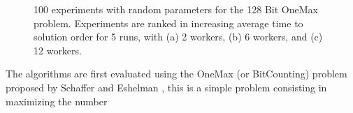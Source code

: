 \documentclass[conference]{IEEEtran}
\begin{document}
\begin{figure}[h!tb]
    \centering

    \caption{100 experiments with random parameters for the 128 Bit OneMax problem.
    Experiments are ranked in increasing average time to solution
    order for 5 runs, with (a) 2 workers, (b) 6 workers, and (c) 12 workers.}
    \label{fig:effort}
  \end{figure}
The algorithms are first evaluated using the OneMax (or BitCounting) problem proposed by
Schaffer and Eshelman \cite{SE91}, this is a simple problem consisting in maximizing the number
\end{document}
